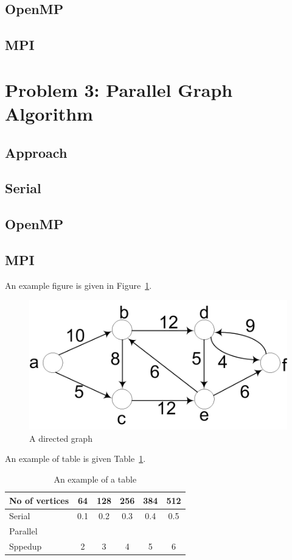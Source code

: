 \subsection{OpenMP} 
\subsection{MPI}
\pagebreak
\section{Problem 3: Parallel Graph Algorithm}
\subsection*{Approach}
\subsection{Serial}
\subsection{OpenMP}
\subsection{MPI}
An example figure is given in Figure~\ref{fig:sp_fig1}.
\begin{figure}[htb]
	\centering
	\includegraphics[width=0.5\linewidth]{pics/sp_fig1.png}
	\caption{A directed graph}\label{fig:sp_fig1}
\end{figure}

An example of table is given Table~\ref{tab:example}.
\begin{table}[htb]
	\centering
	\caption{An example of a table}\label{tab:example}
	\begin{tabular}{l|ccccc}
		\toprule
		No of vertices & 64 & 128 & 256 & 384 & 512\\
		\midrule
		Serial &0.1&0.2&0.3&0.4&0.5\\
		Parallel &&&&\\
		Sppedup &2&3&4&5&6\\
		\bottomrule
	\end{tabular}
\end{table} 

 

